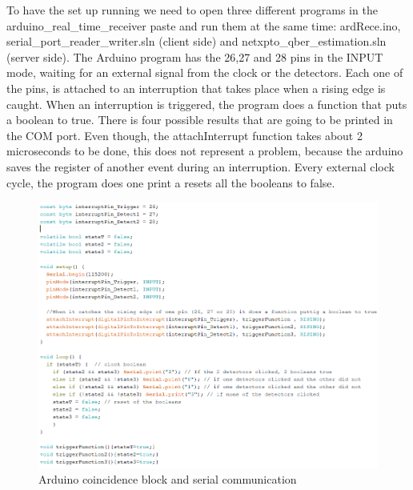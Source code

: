 \begin{refsection}
		To have the set up running we need to open three different programs in the arduino\_real\_time\_receiver paste and run them at the same time: ardRece.ino, serial\_port\_reader\_writer.sln (client side) and netxpto\_qber\_estimation.sln (server side).
		The Arduino program has the 26,27 and 28 pins in the INPUT mode, waiting for an external signal from the clock or the detectors. Each one of the pins, is attached to an interruption that takes place when a rising edge is caught. When an interruption is triggered, the program does a function that puts a boolean to true. There is four possible results that are going to be printed in the COM port.
		Even though, the attachInterrupt function takes about 2 microseconds to be done, this does not represent a problem, because the arduino saves the register of another event during an interruption.
		Every external clock cycle, the program does one print a resets all the booleans to false.
		
		\begin{figure}[H]
			\centering
			\includegraphics[width=0.85\linewidth]{./sdf/arduino_quantum_rx/figures/arduinoComPC.PNG}
			\caption{Arduino coincidence block and serial communication}
			\label{montage}
			
		\end{figure}
		

\end{refsection}

